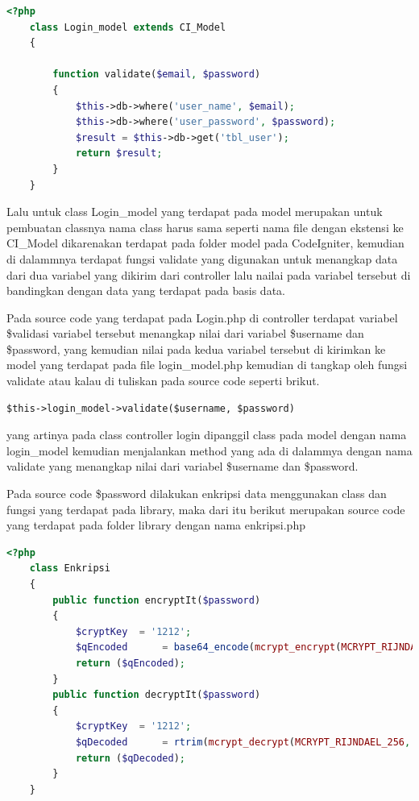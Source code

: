 \begin{lstlisting}[language=PHP]
	<?php  
	class Login_model extends CI_Model  
	{  
	  
	    function validate($email, $password)  
	    {  
	        $this->db->where('user_name', $email);  
	        $this->db->where('user_password', $password);  
	        $result = $this->db->get('tbl_user');  
	        return $result;  
	    }  
	}  
\end{lstlisting}
Lalu untuk class Login\_model yang terdapat pada model merupakan untuk pembuatan classnya nama class harus sama seperti nama file dengan ekstensi ke CI\_Model dikarenakan terdapat pada folder model pada CodeIgniter, kemudian di dalammnya terdapat fungsi validate yang digunakan untuk menangkap data dari dua variabel yang dikirim dari controller lalu nailai pada variabel tersebut di bandingkan dengan data yang terdapat pada basis data.\par
Pada source code yang terdapat pada Login.php di controller terdapat variabel \$validasi variabel tersebut menangkap nilai dari variabel \$username dan \$password, yang kemudian nilai pada kedua variabel tersebut di kirimkan ke model yang terdapat pada file login\_model.php kemudian di tangkap oleh fungsi validate atau kalau di tuliskan pada source code seperti brikut.
\begin{verbatim}
$this->login_model->validate($username, $password) 
\end{verbatim}
yang artinya pada class controller login dipanggil class pada model dengan nama login\_model kemudian menjalankan method yang ada di dalammya dengan nama validate yang menangkap nilai dari variabel \$username dan \$password.\par

\pagebreak
Pada source code \$password dilakukan enkripsi data menggunakan class dan fungsi yang terdapat pada library, maka dari itu berikut merupakan source code yang terdapat pada folder library dengan nama enkripsi.php\par


\begin{lstlisting}[language=PHP]
	<?php  
	class Enkripsi  
	{  
	    public function encryptIt($password)  
	    {  
	        $cryptKey  = '1212';  
	        $qEncoded      = base64_encode(mcrypt_encrypt(MCRYPT_RIJNDAEL_256, md5($cryptKey), $password, MCRYPT_MODE_CBC, md5(md5($cryptKey))));  
	        return ($qEncoded);  
	    }  
	    public function decryptIt($password)  
	    {  
	        $cryptKey  = '1212';  
	        $qDecoded      = rtrim(mcrypt_decrypt(MCRYPT_RIJNDAEL_256, md5($cryptKey), base64_decode($password), MCRYPT_MODE_CBC, md5(md5($cryptKey))), "\0");  
	        return ($qDecoded);  
	    }  
	} 
\end{lstlisting}

